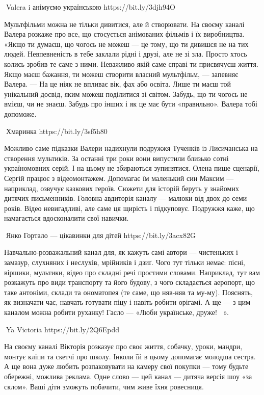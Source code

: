 🦉Valera i анімуємо українською https://bit.ly/3djh94O

Мультфільми можна не тільки дивитися, але й створювати. На своєму каналі Валера розкаже про все, що стосується анімованих фільмів і їх виробництва. «Якщо ти думаєш, що чогось не можеш — це тому, що ти дивишся не на тих людей. Невпевненість в тебе заклали рідні і друзі, але не зі зла. Просто хтось колись зробив те саме з ними. Неважливо якій саме справі ти присвячуєш життя. Якщо маєш бажання, ти можеш створити власний мультфільм, — запевняє Валера. — На це ніяк не впливає вік, фах або освіта. Лише ти маєш той унікальний досвід, яким можеш поділитися зі світом. Забудь, що ти чогось не вмієш, чи не знаєш. Забудь про інших і як це має бути «правильно». Валера тобі допоможе. 

🦉Хмаринка https://bit.ly/3sf5h80 

Можливо саме підказки Валери надихнули подружжя Тученків із Лисичанська на створення мультиків. За останні три роки вони випустили близько сотні україномовних серій. І на цьому не збираються зупинятися. Олена пише сценарії, Сергій працює з відеомонтажем. Допомагає їм маленький син Максим — наприклад, озвучує казкових героїв. Сюжети для історій беруть у знайомих дитячих письменників. Головна авдиторія каналу — малюки від двох до семи років. Відео невигадливі, але саме ця щирість і підкуповує. Подружжя каже, що намагається вдосконалити свої навички.

🦉Янко Гортало — цікавинки для дітей https://bit.ly/3acx82G 

Навчально-розважальний канал для, як кажуть самі автори — чистеньких і замазур, слухняних і неслухів, мрійників і дзиґ. Чого тут тільки немає: пісні, віршики, мультики, відео про складні речі простими словами. Наприклад, тут вам розкажуть про види транспорту та його будову, з чого складається аеропорт, що таке антоніми, склади та ономатопея (те саме, що няв-няв та му-му). Пояснять, як визначати час, навчать готувати піцу і навіть робити орігамі. А ще — з цим каналом можна робити руханку! Гасло — «Люби українське, друже! 💛💙».

🦉Ya Victoria https://bit.ly/2Q6Epdd

На своєму каналі Вікторія розказує про своє життя, собачку, уроки, мандри, монтує кліпи та скетчі про школу. Інколи їй в цьому допомагає молодша сестра. А ще вона дуже любить розпаковувати на камеру свої покупки — тому будьте обережні, можлива реклама. Одне слово — цей канал — дитяча версія шоу «за склом». Ваші діти зможуть побачити, чим живе їхня ровесниця.

